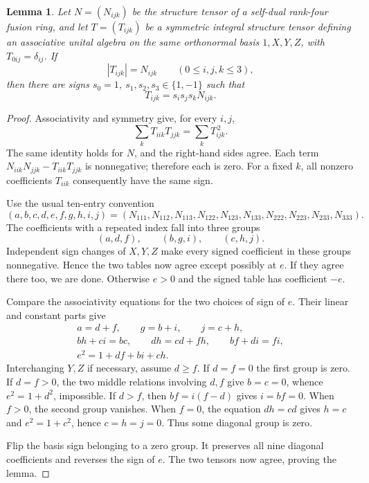 \documentclass[11pt,a4paper]{article}
\newtheorem{lemma}[theorem]{Lemma}
\theoremstyle{definition}\newtheorem{definition}[theorem]{Definition}
\theoremstyle{remark}\newtheorem{remark}[theorem]{Remark}
\numberwithin{equation}{section}
\begin{document}
\begin{lemma}\label{trace:lem:absolute-rigidity}
Let $N=(N_{ijk})$ be the structure tensor of a self-dual rank-four fusion ring, and let $T=(T_{ijk})$ be a symmetric integral structure tensor defining an associative unital algebra on the same orthonormal basis $1,X,Y,Z$, with $T_{0ij}=\delta_{ij}$. If
\[
|T_{ijk}|=N_{ijk}\qquad(0\le i,j,k\le3),
\]
then there are signs $s_0=1$, $s_1,s_2,s_3\in\{1,-1\}$ such that
\[
T_{ijk}=s_i s_j s_k N_{ijk}.
\]
\end{lemma}
\begin{proof}
Associativity and symmetry give, for every $i,j$,
\[
\sum_k T_{iik}T_{jjk}=\sum_k T_{ijk}^{\,2}.
\]
The same identity holds for $N$, and the right-hand sides agree. Each term
$N_{iik}N_{jjk}-T_{iik}T_{jjk}$ is nonnegative; therefore each is zero. For a fixed $k$, all nonzero coefficients $T_{iik}$ consequently have the same sign.

Use the usual ten-entry convention
\[
(a,b,c,d,e,f,g,h,i,j)
=(N_{111},N_{112},N_{113},N_{122},N_{123},
N_{133},N_{222},N_{223},N_{233},N_{333}).
\]
The coefficients with a repeated index fall into three groups
\[
(a,d,f),\qquad(b,g,i),\qquad(c,h,j).
\]
Independent sign changes of $X,Y,Z$ make every signed coefficient in these groups nonnegative. Hence the two tables now agree except possibly at $e$. If they agree there too, we are done. Otherwise $e>0$ and the signed table has coefficient $-e$.

Compare the associativity equations for the two choices of sign of $e$. Their linear and constant parts give
\begin{gather*}
a=d+f,\qquad g=b+i,\qquad j=c+h,\\
bh+ci=bc,\qquad dh=cd+fh,\qquad bf+di=fi,\\
e^2=1+df+bi+ch.
\end{gather*}
Interchanging $Y,Z$ if necessary, assume $d\ge f$. If $d=f=0$ the
first group is zero. If $d=f>0$, the two middle relations involving
$d,f$ give $b=c=0$, whence $e^2=1+d^2$, impossible. If $d>f$,
then $bf=i(f-d)$ gives $i=bf=0$. When $f>0$, the second group
vanishes. When $f=0$, the equation $dh=cd$ gives $h=c$ and
$e^2=1+c^2$, hence $c=h=j=0$. Thus some diagonal group is zero.

Flip the basis sign belonging to a zero group. It preserves all nine diagonal coefficients and reverses the sign of $e$. The two tensors now agree, proving the lemma.
\end{proof}
\end{document}
